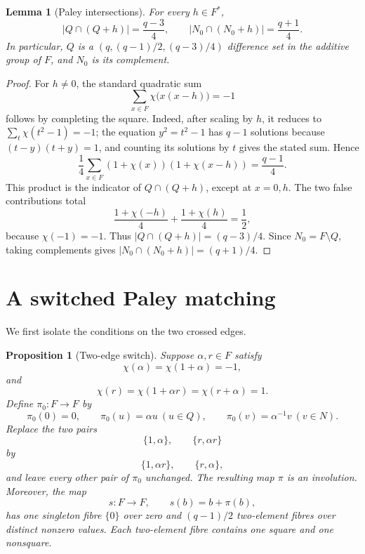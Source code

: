 \documentclass[11pt]{article}
\newtheorem{lemma}[theorem]{Lemma}
\newtheorem{proposition}[theorem]{Proposition}
\theoremstyle{definition}
\theoremstyle{remark}
\begin{document}
\begin{lemma}[Paley intersections]
\label{lem:paley}
For every \(h\in F^*\),
\[
 |Q\cap(Q+h)|=\frac{q-3}{4},\qquad
 |N_0\cap(N_0+h)|=\frac{q+1}{4}.
\]
In particular, \(Q\) is a
\((q,(q-1)/2,(q-3)/4)\) difference set in the additive group of \(F\),
and \(N_0\) is its complement.
\end{lemma}

\begin{proof}
For \(h\ne0\), the standard quadratic sum
\[
 \sum_{x\in F}\chi\bigl(x(x-h)\bigr)=-1
\]
follows by completing the square.  Indeed, after scaling by \(h\), it reduces
to \(\sum_t\chi(t^2-1)=-1\); the equation \(y^2=t^2-1\) has \(q-1\)
solutions because \((t-y)(t+y)=1\), and counting its solutions by \(t\)
gives the stated sum.  Hence
\[
 \frac14\sum_{x\in F}(1+\chi(x))(1+\chi(x-h))=\frac{q-1}{4}.
\]
This product is the indicator of \(Q\cap(Q+h)\), except at \(x=0,h\).
The two false contributions total
\[
 \frac{1+\chi(-h)}4+\frac{1+\chi(h)}4=\frac12,
\]
because \(\chi(-1)=-1\).  Thus \(|Q\cap(Q+h)|=(q-3)/4\).
Since \(N_0=F\setminus Q\), taking complements gives
\(|N_0\cap(N_0+h)|=(q+1)/4\).
\end{proof}

\section{A switched Paley matching}
We first isolate the conditions on the two crossed edges.

\begin{proposition}[Two-edge switch]
\label{prop:switch}
Suppose \(\alpha,r\in F\) satisfy
\begin{equation}
 \chi(\alpha)=\chi(1+\alpha)=-1,
 \label{eq:alpha-conditions}
\end{equation}
and
\begin{equation}
 \chi(r)=\chi(1+\alpha r)=\chi(r+\alpha)=1.
 \label{eq:r-conditions}
\end{equation}
Define \(\pi_0:F\to F\) by
\begin{equation}
 \pi_0(0)=0,\qquad
 \pi_0(u)=\alpha u\ (u\in Q),\qquad
 \pi_0(v)=\alpha^{-1}v\ (v\in N).
 \label{eq:baseline-involution}
\end{equation}
Replace the two pairs
\[
 \{1,\alpha\},\qquad \{r,\alpha r\}
\]
by
\[
 \{1,\alpha r\},\qquad \{r,\alpha\},
\]
and leave every other pair of \(\pi_0\) unchanged.  The resulting map
\(\pi\) is an involution.  Moreover, the map
\begin{equation}
 s:F\longrightarrow F,\qquad s(b)=b+\pi(b),
 \label{eq:sum-map}
\end{equation}
has one singleton fibre \(\{0\}\) over zero and \((q-1)/2\) two-element
fibres over distinct nonzero values.  Each two-element fibre contains one
square and one nonsquare.
\end{proposition}
\end{document}
